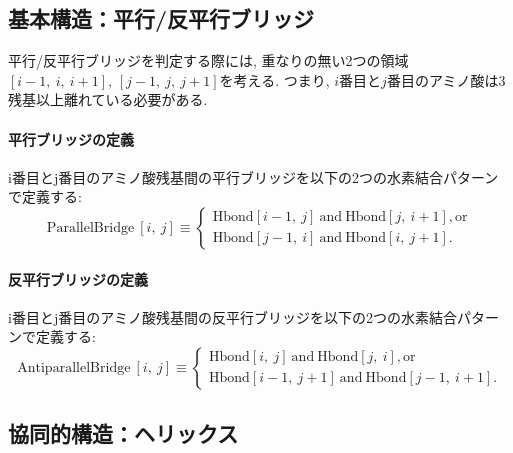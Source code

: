 

\subsection{基本構造：平行/反平行ブリッジ}
平行/反平行ブリッジを判定する際には, 重なりの無い2つの領域
$[i-1,~ i,~ i+1]$, $[j-1,~ j,~ j+1]$を考える.
つまり, $i$番目と$j$番目のアミノ酸は3残基以上離れている必要がある.

\paragraph{平行ブリッジの定義}
i番目とj番目のアミノ酸残基間の平行ブリッジを以下の2つの水素結合パターンで定義する:
\begin{equation}
 \mathrm{Parallel}\mathrm{Bridge}~[i,~j]
 \equiv
 \begin{cases}
  \mathrm{H bond}[i  - 1,~ j]~ \mathrm{and}~ \mathrm{H bond}[j ,~ i  + 1], \mathrm{or}\\
  \mathrm{H bond}[j  - 1,~ i]~ \mathrm{and}~ \mathrm{H bond}[i ,~ j  + 1].
 \end{cases}
\end{equation}

\paragraph{反平行ブリッジの定義}
i番目とj番目のアミノ酸残基間の反平行ブリッジを以下の2つの水素結合パターンで定義する:
\begin{equation}
 \mathrm{Antiparallel}\mathrm{Bridge}~[i,~ j]
 \equiv
 \begin{cases}
  \mathrm{H bond}[i,~ j]~         \mathrm{and}~ \mathrm{H bond}[j,~ i], \mathrm{or}\\
  \mathrm{H bond}[i - 1,~ j + 1]~ \mathrm{and}~ \mathrm{H bond}[j - 1,~ i + 1].
 \end{cases}
\end{equation}


\subsection{協同的構造：ヘリックス}
